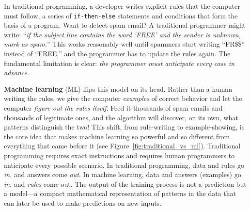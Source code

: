 In traditional programming, a developer writes explicit rules that the computer must follow, a series of \texttt{if-then-else} statements and conditions that form the basis of a program.
Want to detect spam email? A traditional programmer might write: ``\textit{if the subject line contains the word `FREE' and the sender is unknown, mark as spam.}''
This works reasonably well until spammers start writing ``FR\$\$'' instead of ``FREE,'' and the programmer has to update the rules again.
The fundamental limitation is clear: \textit{the programmer must anticipate every case in advance}. 

\textbf{Machine learning} (ML) flips this model on its head. Rather than a human writing the rules, we give the computer \textit{examples} of correct behavior and let the computer \textit{figure out the rules itself}.
Feed it thousands of spam emails and thousands of legitimate ones, and the algorithm will discover, on its own, what patterns distinguish the two!  
This shift, from rule-writing to example-showing, is the core idea that makes machine learning so powerful and so different from everything that came before it (see Figure~\ref{fig:traditional_vs_ml}). 
Traditional programming requires exact instructions and requires human programmers to anticipate every possible scenario.
In traditional programming, data and rules go \textit{in}, and answers come \textit{out}. 
In machine learning, data and answers (examples) go \textit{in}, and \textit{rules} come out.  
The output of the training process is not a prediction but a model---a compact mathematical representation of patterns in the data that can later be used to make predictions on new inputs.

